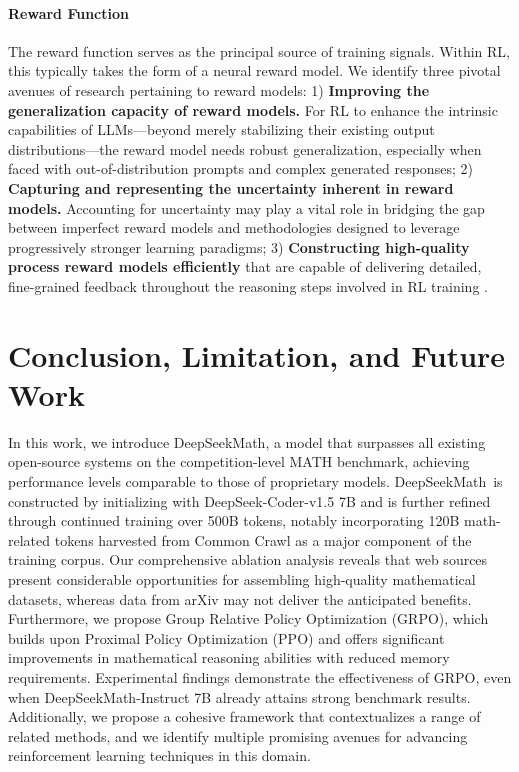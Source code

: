 \begin{itemize}[topsep=0pt]
\begin{itemize}[topsep=0pt]
\paragraph{Reward Function} The reward function serves as the principal source of training signals. Within RL, this typically takes the form of a neural reward model. We identify three pivotal avenues of research pertaining to reward models: 1) \textbf{Improving the generalization capacity of reward models.} For RL to enhance the intrinsic capabilities of LLMs—beyond merely stabilizing their existing output distributions—the reward model needs robust generalization, especially when faced with out-of-distribution prompts and complex generated responses; 2) \textbf{Capturing and representing the uncertainty inherent in reward models.} Accounting for uncertainty may play a vital role in bridging the gap between imperfect reward models and methodologies designed to leverage progressively stronger learning paradigms; 3) \textbf{Constructing high-quality process reward models efficiently} that are capable of delivering detailed, fine-grained feedback throughout the reasoning steps involved in RL training \citep{lightman2023let,wang2023math}.

\section{Conclusion, Limitation, and Future Work}  
In this work, we introduce DeepSeekMath, a model that surpasses all existing open-source systems on the competition-level MATH benchmark, achieving performance levels comparable to those of proprietary models. DeepSeekMath~is constructed by initializing with DeepSeek-Coder-v1.5 7B and is further refined through continued training over 500B tokens, notably incorporating 120B math-related tokens harvested from Common Crawl as a major component of the training corpus. Our comprehensive ablation analysis reveals that web sources present considerable opportunities for assembling high-quality mathematical datasets, whereas data from arXiv may not deliver the anticipated benefits. Furthermore, we propose Group Relative Policy Optimization (GRPO), which builds upon Proximal Policy Optimization (PPO) and offers significant improvements in mathematical reasoning abilities with reduced memory requirements. Experimental findings demonstrate the effectiveness of GRPO, even when DeepSeekMath-Instruct 7B already attains strong benchmark results. Additionally, we propose a cohesive framework that contextualizes a range of related methods, and we identify multiple promising avenues for advancing reinforcement learning techniques in this domain.


\end{itemize}
\end{itemize}
